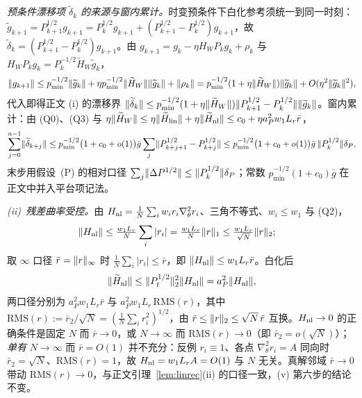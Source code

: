 \documentclass[fontset=windows,11pt]{ctexart}
\DeclarePairedDelimiter{\norm}{\lVert}{\rVert}
\newcommand{\W}{W}
\newcommand{\wt}[1]{\widetilde{#1}}
\numberwithin{equation}{section}
\begin{document}
\medskip
\emph{预条件漂移项 $\wt\delta_k$ 的来源与窗内累计。}时变预条件下白化参考须统一到同一时刻：$\wt g_{k+1}=P_{k+1}^{1/2}g_{k+1}=P_k^{1/2}g_{k+1}+(P_{k+1}^{1/2}-P_k^{1/2})g_{k+1}$，故 $\wt\delta_k=(P_{k+1}^{1/2}-P_k^{1/2})g_{k+1}$。由 $g_{k+1}=g_k-\eta H_\W P_kg_k+\rho_k$ 与 $H_\W P_kg_k=P_k^{-1/2}\wt H_\W\wt g_k$，
\begin{equation}
\norm{g_{k+1}}\le p_{\min}^{-1/2}\norm{\wt g_k}+\eta p_{\min}^{-1/2}\norm{\wt H_\W}\norm{\wt g_k}+\norm{\rho_k}
=p_{\min}^{-1/2}(1+\eta\norm{\wt H_\W})\norm{\wt g_k}+O(\eta^2\norm{\wt g_k}^2),
\end{equation}
代入即得正文 (i) 的漂移界 $\norm{\wt\delta_k}\le p_{\min}^{-1/2}(1+\eta\norm{\wt H_\W})\norm{P_{k+1}^{1/2}-P_k^{1/2}}\norm{\wt g_k}$。窗内累计：由 (Q0)、(Q3) 与 $\eta\norm{\wt H_\W}\le\eta\norm{\wt H_{\rm lin}}+\eta\norm{\wt H_{\rm nl}}\le c_0+\eta a_P^2w_1L_r\bar r$，
\begin{equation}
\sum_{j=0}^{n-1}\norm{\wt\delta_{k+j}}
\le p_{\min}^{-1/2}\bigl(1+c_0+o(1)\bigr)\bar g\sum_{j}\norm{P_{k+j+1}^{1/2}-P_{k+j}^{1/2}}
\le p_{\min}^{-1/2}\bigl(1+c_0+o(1)\bigr)\bar g\,\norm{P_k^{1/2}}\delta_P,
\end{equation}
末步用假设~(P) 的相对口径 $\sum_j\norm{\Delta P^{1/2}}\le\norm{P_k^{1/2}}\delta_P$；常数 $p_{\min}^{-1/2}(1+c_0)\bar g$ 在正文中并入平台项记法。

\medskip
\emph{(ii)~残差曲率受控。}由 $H_{\rm nl}=\tfrac1N\sum_iw_ir_i\nabla_\theta^2r_i$、三角不等式、$w_i\le w_1$ 与 (Q2)，
\begin{align}
\norm{H_{\rm nl}}
&\le\tfrac{w_1L_r}{N}\sum_i|r_i|
=\tfrac{w_1L_r}{N}\norm r_1
\le\tfrac{w_1L_r}{\sqrt N}\norm r_2;
\end{align}
取 $\infty$ 口径 $\bar r=\norm r_\infty$ 时 $\tfrac1N\sum_i|r_i|\le\bar r$，即 $\norm{H_{\rm nl}}\le w_1L_r\bar r$。白化后
\begin{equation}
\norm{\wt H_{\rm nl}}\le\norm{P_t^{1/2}}_2^2\norm{H_{\rm nl}}=a_P^2\norm{H_{\rm nl}},
\end{equation}
两口径分别为 $a_P^2w_1L_r\bar r$ 与 $a_P^2w_1L_r\,\mathrm{RMS}(r)$，其中 $\mathrm{RMS}(r):=\bar r_2/\sqrt N=(\tfrac1N\sum_i r_i^2)^{1/2}$，由 $\bar r\le\norm r_2\le\sqrt N\,\bar r$ 互换。$H_{\rm nl}\to0$ 的正确条件是固定 $N$ 而 $\bar r\to0$，或 $N\to\infty$ 而 $\mathrm{RMS}(r)\to0$（即 $\bar r_2=o(\sqrt N)$）；\emph{单有} $N\to\infty$ 而 $\bar r=O(1)$ 并不充分：反例 $r_i\equiv1$、各点 $\nabla_\theta^2r_i=A$ 同向时 $\bar r_2=\sqrt N$、$\mathrm{RMS}(r)=1$，故 $H_{\rm nl}=w_1L_rA=O(1)$ 与 $N$ 无关。真解邻域 $\bar r\to0$ 带动 $\mathrm{RMS}(r)\to0$，与正文引理~\ref{lem:linrec}(ii) 的口径一致，(v) 第六步的结论不变。
\end{document}
